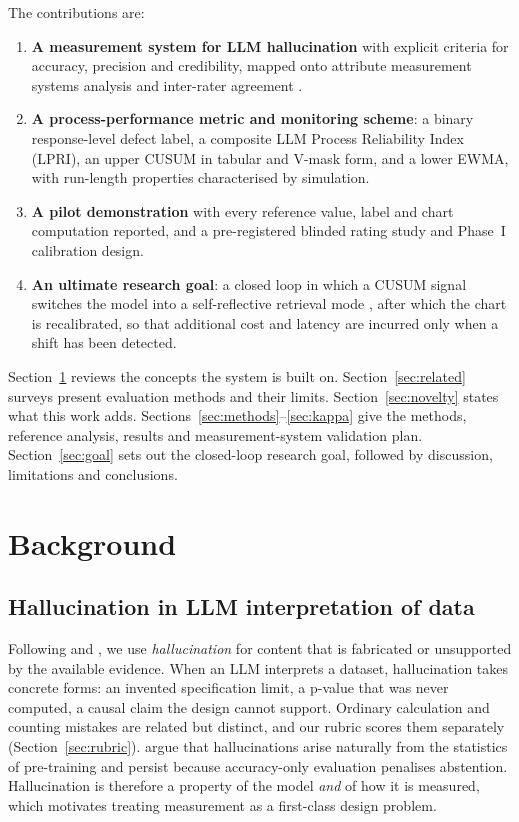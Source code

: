 \documentclass[11pt]{article}
\begin{document}
The contributions are:
\begin{enumerate}[leftmargin=*]
\item \textbf{A measurement system for LLM hallucination} with explicit criteria for accuracy, precision and credibility, mapped onto attribute measurement systems analysis \citep{aiag2010msa} and inter-rater agreement \citep{cohen1960,byrt1993}.
\item \textbf{A process-performance metric and monitoring scheme}: a binary response-level defect label, a composite LLM Process Reliability Index (LPRI), an upper CUSUM in tabular and V-mask form, and a lower EWMA, with run-length properties characterised by simulation.
\item \textbf{A pilot demonstration} with every reference value, label and chart computation reported, and a pre-registered blinded rating study and Phase~I calibration design.
\item \textbf{An ultimate research goal}: a closed loop in which a CUSUM signal switches the model into a self-reflective retrieval mode \citep{asai2024selfrag}, after which the chart is recalibrated, so that additional cost and latency are incurred only when a shift has been detected.
\end{enumerate}

Section~\ref{sec:background} reviews the concepts the system is built on. Section~\ref{sec:related} surveys present evaluation methods and their limits. Section~\ref{sec:novelty} states what this work adds. Sections~\ref{sec:methods}--\ref{sec:kappa} give the methods, reference analysis, results and measurement-system validation plan. Section~\ref{sec:goal} sets out the closed-loop research goal, followed by discussion, limitations and conclusions.

\section{Background}\label{sec:background}

\subsection{Hallucination in LLM interpretation of data}
Following \citet{ji2023hallucination} and \citet{huang2025survey}, we use \emph{hallucination} for content that is fabricated or unsupported by the available evidence. When an LLM interprets a dataset, hallucination takes concrete forms: an invented specification limit, a p-value that was never computed, a causal claim the design cannot support. Ordinary calculation and counting mistakes are related but distinct, and our rubric scores them separately (Section~\ref{sec:rubric}). \citet{kalai2025why} argue that hallucinations arise naturally from the statistics of pre-training and persist because accuracy-only evaluation penalises abstention. Hallucination is therefore a property of the model \emph{and} of how it is measured, which motivates treating measurement as a first-class design problem.
\end{document}
